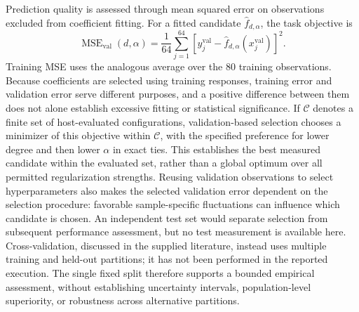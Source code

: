 \documentclass[11pt]{article}
\begin{document}
Prediction quality is assessed through mean squared error on observations excluded from coefficient fitting. For a fitted candidate \(\widehat f_{d,\alpha}\), the task objective is
\[
\operatorname{MSE}_{\mathrm{val}}(d,\alpha)
=
\frac{1}{64}
\sum_{j=1}^{64}
\left[
y_j^{\mathrm{val}}
-
\widehat f_{d,\alpha}(x_j^{\mathrm{val}})
\right]^2.
\]
Training MSE uses the analogous average over the 80 training observations. Because coefficients are selected using training responses, training error and validation error serve different purposes, and a positive difference between them does not alone establish excessive fitting or statistical significance. If \(\mathcal C\) denotes a finite set of host-evaluated configurations, validation-based selection chooses a minimizer of this objective within \(\mathcal C\), with the specified preference for lower degree and then lower \(\alpha\) in exact ties. This establishes the best measured candidate within the evaluated set, rather than a global optimum over all permitted regularization strengths. Reusing validation observations to select hyperparameters also makes the selected validation error dependent on the selection procedure: favorable sample-specific fluctuations can influence which candidate is chosen. An independent test set would separate selection from subsequent performance assessment, but no test measurement is available here. Cross-validation, discussed in the supplied literature, instead uses multiple training and held-out partitions; it has not been performed in the reported execution. The single fixed split therefore supports a bounded empirical assessment, without establishing uncertainty intervals, population-level superiority, or robustness across alternative partitions.
\end{document}
